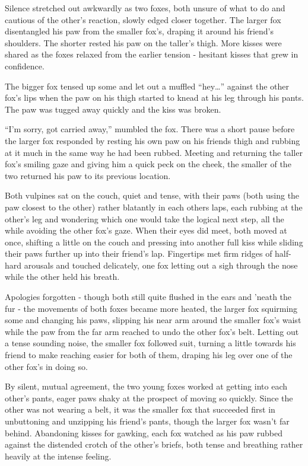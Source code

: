 Silence stretched out awkwardly as two foxes, both unsure of what to do and cautious of the other's reaction, slowly edged closer together. The larger fox disentangled his paw from the smaller fox's, draping it around his friend's shoulders. The shorter rested his paw on the taller's thigh. More kisses were shared as the foxes relaxed from the earlier tension - hesitant kisses that grew in confidence.

The bigger fox tensed up some and let out a muffled ``hey\ldots{}'' against the other fox's lips when the paw on his thigh started to knead at his leg through his pants. The paw was tugged away quickly and the kiss was broken.

``I'm sorry, got carried away,'' mumbled the fox. There was a short pause before the larger fox responded by resting his own paw on his friends thigh and rubbing at it much in the same way he had been rubbed. Meeting and returning the taller fox's smiling gaze and giving him a quick peck on the cheek, the smaller of the two returned his paw to its previous location.

Both vulpines sat on the couch, quiet and tense, with their paws (both using the paw closest to the other) rather blatantly in each others laps, each rubbing at the other's leg and wondering which one would take the logical next step, all the while avoiding the other fox's gaze. When their eyes did meet, both moved at once, shifting a little on the couch and pressing into another full kiss while sliding their paws further up into their friend's lap. Fingertips met firm ridges of half-hard arousals and touched delicately, one fox letting out a sigh through the nose while the other held his breath.

Apologies forgotten - though both still quite flushed in the ears and 'neath the fur - the movements of both foxes became more heated, the larger fox squirming some and changing his paws, slipping his near arm around the smaller fox's waist while the paw from the far arm reached to undo the other fox's belt. Letting out a tense sounding noise, the smaller fox followed suit, turning a little towards his friend to make reaching easier for both of them, draping his leg over one of the other fox's in doing so.

By silent, mutual agreement, the two young foxes worked at getting into each other's pants, eager paws shaky at the prospect of moving so quickly. Since the other was not wearing a belt, it was the smaller fox that succeeded first in unbuttoning and unzipping his friend's pants, though the larger fox wasn't far behind. Abandoning kisses for gawking, each fox watched as his paw rubbed against the distended crotch of the other's briefs, both tense and breathing rather heavily at the intense feeling.

